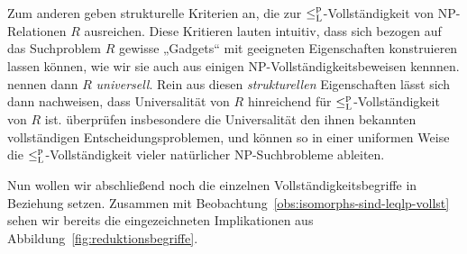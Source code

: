 Zum anderen geben \textcite{agrawal_universal_1992} strukturelle Kriterien an, die zur $\leq_\mathrm{L}^\mathrm{p}$-Vollständigkeit von NP-Relationen $R$ ausreichen. Diese Kritieren lauten intuitiv, dass sich bezogen auf das Suchproblem $R$ gewisse „Gadgets“ mit geeigneten Eigenschaften konstruieren lassen können, wie wir sie auch aus einigen NP-Vollständigkeitsbeweisen kennnen. \citeauthor{agrawal_universal_1992} nennen dann $R$ \emph{universell}. 
Rein aus diesen \emph{strukturellen} Eigenschaften lässt sich dann nachweisen, dass Universalität von $R$ hinreichend für $\leq_\mathrm{L}^\mathrm{p}$-Vollständigkeit von $R$ ist. 
\textcite{agrawal_universal_1992} überprüfen insbesondere die Universalität den ihnen bekannten vollständigen Entscheidungsproblemen, und können so in einer uniformen Weise die $\leq_\mathrm{L}^\mathrm{p}$-Vollständigkeit vieler natürlicher NP-Suchbrobleme ableiten.

Nun wollen wir abschließend noch die einzelnen Vollständigkeitsbegriffe in Beziehung setzen.
Zusammen mit Beobachtung~\ref{obs:isomorphs-sind-leqlp-vollst} sehen wir bereits die eingezeichneten Implikationen aus Abbildung~\ref{fig:reduktionsbegriffe}.

